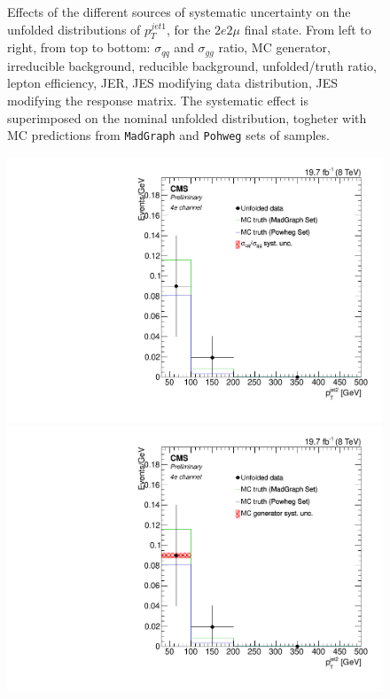 \begin{figure}[hbtp]
\begin{center}
   \caption{Effects of the different sources of systematic uncertainty on the unfolded distributions of $p_{T}^{jet1}$, for the     
   $2e2\mu$ final state. From left to right, from top to bottom: $\sigma_{qq}$ and $\sigma_{gg}$ ratio, MC generator, irreducible background, reducible background, unfolded/truth ratio, lepton efficiency, JER, JES modifying data distribution, JES modifying the response matrix. The systematic effect is superimposed on the nominal unfolded distribution, togheter with MC predictions from \texttt{MadGraph} and \texttt{Pohweg} sets of samples.}
   \label{fig:PtJet1syst2e2m}
 \end{center}
\end{figure}

\begin{figure}[hbtp]
 \begin{center}
   \includegraphics[width=0.8\cmsFigWidth]{Figures/Unfolding/Systematics/ZZTo4e_PtJet2_qqgg_Mad_fr}     
   \includegraphics[width=0.8\cmsFigWidth]{Figures/Unfolding/Systematics/ZZTo4e_PtJet2_MCgen_Mad_fr}     

\end{center}
\end{figure}
